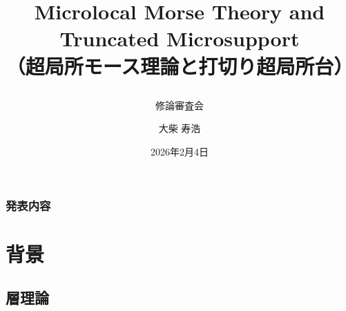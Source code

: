 \documentclass[dvipdfmx,10pt,aspectratio=169,leqno]{beamer}%
\title{Microlocal Morse Theory and Truncated Microsupport\\
（超局所モース理論と打切り超局所台）
\subtitle{修論審査会}}
\date{2026年2月4日}
\author{大柴 寿浩}
\institute[NITech]
{
北海道大学大学院理学院数学専攻
}
\numberwithin{equation}{subsection}
\theoremstyle{mystyle}
\begin{document}
\begin{frame}
    \titlepage
\end{frame}

\begin{frame}
    \frametitle{発表内容}
    \tableofcontents
\end{frame}

\section[背景]{背景}
\subsection{層理論}
\end{document}
